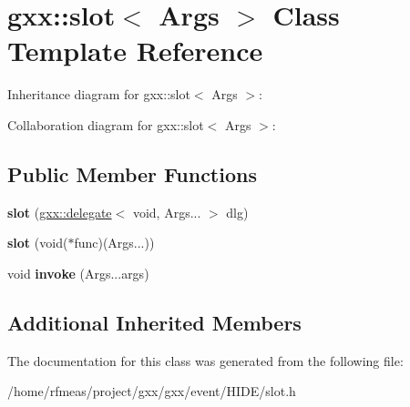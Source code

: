 \hypertarget{classgxx_1_1slot}{}\section{gxx\+:\+:slot$<$ Args $>$ Class Template Reference}
\label{classgxx_1_1slot}


Inheritance diagram for gxx\+:\+:slot$<$ Args $>$\+:


Collaboration diagram for gxx\+:\+:slot$<$ Args $>$\+:
\subsection*{Public Member Functions}
\begin{DoxyCompactItemize}
\item 
{\bfseries slot} (\hyperlink{classgxx_1_1delegate}{gxx\+::delegate}$<$ void, Args... $>$ dlg)\hypertarget{classgxx_1_1slot_a2b4579c39a135776c073b6cb29a5c7e9}{}\label{classgxx_1_1slot_a2b4579c39a135776c073b6cb29a5c7e9}

\item 
{\bfseries slot} (void($\ast$func)(Args...))\hypertarget{classgxx_1_1slot_a55544740c1e98d19d95ae73dde3af258}{}\label{classgxx_1_1slot_a55544740c1e98d19d95ae73dde3af258}

\item 
void {\bfseries invoke} (Args...\+args)\hypertarget{classgxx_1_1slot_a064411cd1dab2b3d3c92f7287c8c869b}{}\label{classgxx_1_1slot_a064411cd1dab2b3d3c92f7287c8c869b}

\end{DoxyCompactItemize}
\subsection*{Additional Inherited Members}


The documentation for this class was generated from the following file\+:\begin{DoxyCompactItemize}
\item 
/home/rfmeas/project/gxx/gxx/event/\+H\+I\+D\+E/slot.\+h\end{DoxyCompactItemize}
